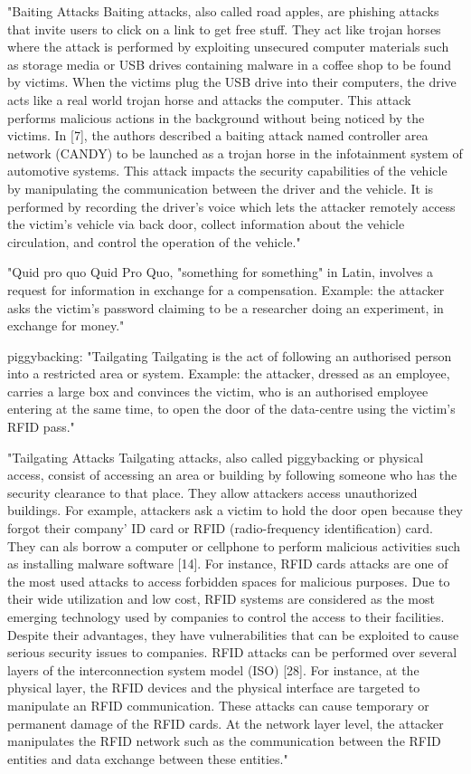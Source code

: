 "Baiting Attacks
Baiting attacks, also called road apples, are phishing attacks that invite users to click on a link to get free stuff.
They act like trojan horses where the attack is performed by exploiting unsecured computer materials such as storage media
or USB drives containing malware in a coffee shop to be found by victims. When the victims plug the USB drive into their computers,
the drive acts like a real world trojan horse and attacks the computer. This attack performs malicious actions in the background
without being noticed by the victims.
In [7], the authors described a baiting attack named controller area network (CANDY) to be launched as a trojan horse in
the infotainment system of automotive systems. This attack impacts the security capabilities of the vehicle by manipulating the
communication between the driver and the vehicle. It is performed by recording the driver’s voice which lets the attacker remotely
access the victim’s vehicle via back door, collect information about the vehicle circulation, and control the operation of the vehicle."\cite{4_mdpi}

"Quid pro quo
Quid Pro Quo, "something for something" in Latin, involves a request for information in exchange for a compensation.
Example: the attacker asks the victim's password claiming to be a researcher doing an experiment, in exchange for money."\cite{1_enisa}

piggybacking:
"Tailgating
Tailgating is the act of following an authorised person into a restricted area or system.
Example: the attacker, dressed as an employee, carries a large box and convinces the victim, who is an authorised employee
entering at the same time, to open the door of the data-centre using the victim's RFID pass."\cite{1_enisa}

"Tailgating Attacks
Tailgating attacks, also called piggybacking or physical access, consist of accessing an area or building by following someone
who has the security clearance to that place. They allow attackers access unauthorized buildings. For example, attackers ask a
victim to hold the door open because they forgot their company’ ID card or RFID (radio-frequency identification) card. They can als
borrow a computer or cellphone to perform malicious activities such as installing malware software [14].
For instance, RFID cards attacks are one of the most used attacks to access forbidden spaces for malicious purposes. Due to their
wide utilization and low cost, RFID systems are considered as the most emerging technology used by companies to control the access to
their facilities. Despite their advantages, they have vulnerabilities that can be exploited to cause serious security issues to companies.
RFID attacks can be performed over several layers of the interconnection system model (ISO) [28]. For instance, at the physical layer, the
RFID devices and the physical interface are targeted to manipulate an RFID communication. These attacks can cause temporary or permanent damage
of the RFID cards. At the network layer level, the attacker manipulates the RFID network such as the communication between the RFID entities and
data exchange between these entities."\cite{4_mdpi}

